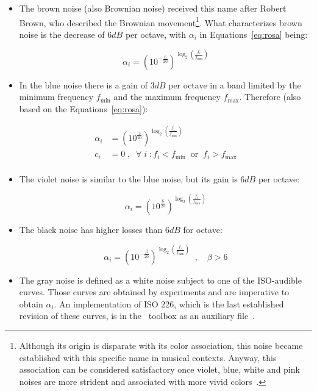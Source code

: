 \begin{itemize}
  \item The brown noise (also Brownian noise) received this name after Robert Brown, who described the Brownian movement\footnote{Although its origin is disparate with its color association, this noise became established with this specific name in musical contexts. Anyway, this association can be considered satisfactory once violet, blue, white and pink noises are more strident and associated with more vivid colors~\cite{Cook,guillaume}.}. What characterizes brown noise is the decrease of $6dB$ per octave, with $\alpha_i$ in Equations~\ref{eq:rosa} being:

\begin{equation}\label{eq:marrom}
 \alpha_i=(10^{-\frac{6}{20}})^{\log _2 \left( \frac{f_i}{f_{\text{min}}} \right )}
\end{equation}

 \item In the blue noise there is a gain of $3dB$ per octave in a band limited by the minimum frequency $f_{\text{min}}$ and the maximum frequency $f_{\text{max}}$. Therefore (also based on the Equations~\ref{eq:rosa}):

\begin{equation}\label{eq:azul}
 \begin{split}
 \alpha_i & = (10^{\frac{3}{20}})^{\log _2 \left ( \frac{f_i}{f_{\text{min}}} \right )} \\
 c_i & =0\;,\;\; \forall \; i \; : f_i<f_{\text{min}} \;\; \text{or} \;\; f_i>f_{\text{max}} \\
 \end{split}
\end{equation}

 \item The violet noise is similar to the blue noise, but its gain is $6dB$ per octave:

\begin{equation}\label{eq:violeta}
 \alpha_i = (10^{\frac{6}{20}})^{\log _2 \left ( \frac{f_i}{f_{\text{min}}} \right )}
\end{equation}

 \item The black noise has higher losses than $6dB$ for octave:

\begin{equation}\label{eq:preto}
 \alpha_i=(10^{-\frac{\beta}{20}})^{\log _2 \left( \frac{f_i}{f_{\text{min}}} \right )}\;\;, \quad \beta > 6
\end{equation}

 \item The gray noise is defined as a white noise subject to one of the ISO-audible curves. Those curves are obtained by experiments and are imperative to obtain $\alpha_i$. An implementation of ISO 226, which is the last established revision of these curves, is in the \massa\ toolbox as an auxiliary file~\cite{MASSA}.
\end{itemize}

